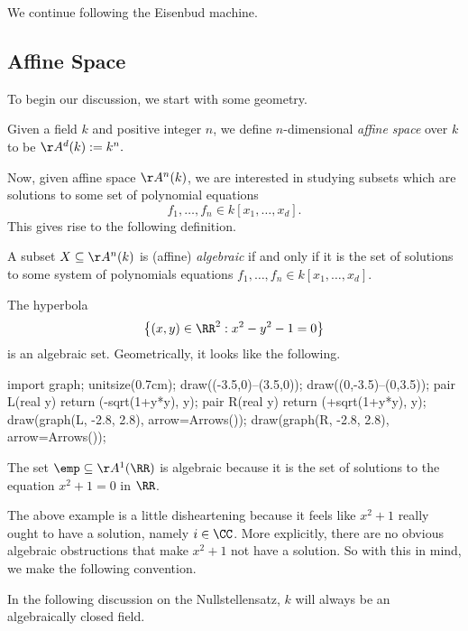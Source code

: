 
We continue following the Eisenbud machine.

\subsection{Affine Space}
To begin our discussion, we start with some geometry.
\begin{definition}
	Given a field $k$ and positive integer $n$, we define $n$-dimensional \textit{affine space} over $k$ to be $\AA^d(k):=k^n.$
\end{definition}
Now, given affine space $\AA^n(k)$, we are interested in studying subsets which are solutions to some set of polynomial equations
\[f_1,\ldots,f_n\in k[x_1,\ldots,x_d].\]
This gives rise to the following definition.
\begin{definition}[Algebraic]
	A subset $X\subseteq\AA^n(k)$ is (affine) \textit{algebraic} if and only if it is the set of solutions to some system of polynomials equations $f_1,\ldots,f_n\in k[x_1,\ldots,x_d]$.
\end{definition}
\begin{example}
	The hyperbola
	\[\left\{(x,y)\in\RR^2:x^2-y^2-1=0\right\}\]
	is an algebraic set. Geometrically, it looks like the following.
	\begin{center}
		\begin{asy}
			import graph;
			unitsize(0.7cm);
			draw((-3.5,0)--(3.5,0)); draw((0,-3.5)--(0,3.5));
			pair L(real y)
			{
				return (-sqrt(1+y*y), y);
			}
			pair R(real y)
			{
				return (+sqrt(1+y*y), y);
			}
			draw(graph(L, -2.8, 2.8), arrow=Arrows());
			draw(graph(R, -2.8, 2.8), arrow=Arrows());
		\end{asy}
	\end{center}
\end{example}
\begin{example} \label{ex:notalgclosed}
	The set $\emp\subseteq\AA^1(\RR)$ is algebraic because it is the set of solutions to the equation $x^2+1=0$ in $\RR$.
\end{example}
The above example is a little disheartening because it feels like $x^2+1$ really ought to have a solution, namely $i\in\CC$. More explicitly, there are no obvious algebraic obstructions that make $x^2+1$ not have a solution. So with this in mind, we make the following convention.
\begin{convention}
	In the following discussion on the Nullstellensatz, $k$ will always be an algebraically closed field.
\end{convention}

